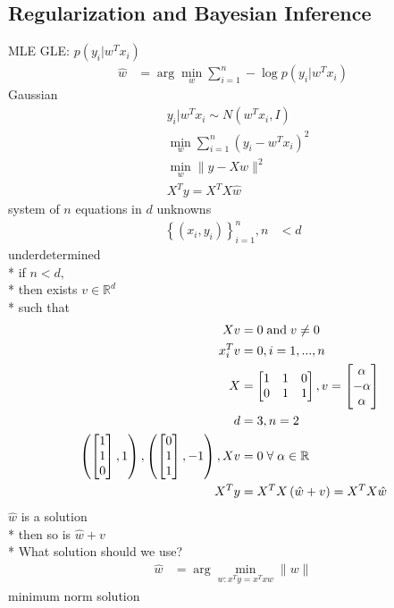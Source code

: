 \documentclass{article}
\begin{document}
\subsection{Regularization and Bayesian Inference}
MLE GLE: $p\left(y_{i} | w^{T} x_{i}\right) $
\begin{align*}
\hat{w} &= \arg\displaystyle\min_{w} \displaystyle\sum_{i=1}^{n} - \log p\left(y_{i} | w^{T} x_{i}\right)
\end{align*}
Gaussian
\begin{align*}
&  y_{i} | w^{T} x_{i} \sim  N\left(w^{T} x_{i}, I \right)
\\ &  \displaystyle\min_{w} \displaystyle\sum_{i=1}^{n} \left(y_{i} - w^{T} x_{i}\right)^{2}
\\ &  \displaystyle\min_{w} \| y - X w \|^{2}
\\ &  X^{T} y = X^{T} X \hat{w}
\end{align*}
system of $n $ equations in $d $ unknowns
\begin{align*}
\left\{\left(x_{i}, y_{i}\right)\right\}_{i=1}^{n} , n  &< d 
\end{align*}
underdetermined
\\* if $n  < d, $
\\* then exists $v \in \mathbb{R}^{d}$
\\* such that
\begin{align*}
X  v &= 0 \text{\;and\;} v \neq  0
\\ x_{i}^{T} v &= 0, i = 1, ..., n 
\\ X  &= \begin{bmatrix} 1 & 1 & 0 \\ 0 & 1 & 1 \end{bmatrix} , v = \begin{bmatrix} \alpha \\ -\alpha \\ \alpha \end{bmatrix}
\\ d  &= 3, n = 2
\\ \left(\begin{bmatrix} 1 \\ 1 \\ 0 \end{bmatrix} , 1\right), \left(\begin{bmatrix} 0 \\ 1 \\ 1 \end{bmatrix} , -1\right), X  v &= 0 \;\forall\; \alpha \in \mathbb{R}
\\ X^{T} y &= X^{T} X \left(\hat{w} + v\right) = X^{T} X \hat{w}
\end{align*}
$\hat{w}$ is a solution
\\* then so is $\hat{w} + v $
\\* What solution should we use?
\begin{align*}
\hat{w} &= \arg\displaystyle\min_{w: x^{T} y = x^{T} x w} \| w \|
\end{align*}
minimum norm solution
\end{document}
